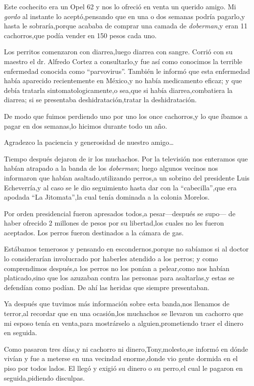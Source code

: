 \documentclass[letterpaper,12pt]{book}
\begin{document}
Este cochecito era un Opel 62 y nos lo ofreció en venta un querido amigo. Mi \textit{gordo} al instante lo aceptó,pensando que en una o dos semanas podría pagarlo,y hasta le sobraría,porque acababa de comprar una camada de \textit{doberman},y eran 11 cachorros,que podía vender en 150 pesos cada uno. 

Los perritos comenzaron con diarrea,luego diarrea con sangre. Corrió con su maestro el dr. Alfredo Cortez a consultarlo,y fue así como conocimos la terrible enfermedad conocida como ``parvovirus''. También le informó que esta enfermedad había aparecido recientemente en México,y no había medicamento eficaz; y que debía tratarla sintomatologicamente,o sea,que si había diarrea,combatiera la diarrea; si se presentaba deshidratación,tratar la deshidratación.

De modo que fuimos perdiendo uno por uno los once cachorros,y lo que íbamos a pagar en dos semanas,lo hicimos durante todo un año.

Agradezco la paciencia y generosidad de nuestro amigo\ldots

Tiempo después dejaron de ir los muchachos. Por la televisión nos enteramos que habían atrapado a la banda de los \textit{doberman}; luego algunos vecinos nos informaron que habían asaltado,utilizando perros,a un sobrino del presidente Luis Echeverría,y al caso se le dio seguimiento hasta dar con la ``cabecilla'',que era apodada ``La Jitomata'',la cual tenía dominada a la colonia Morelos. 

Por orden presidencial fueron apresados todos,a pesar---después se supo--- de haber ofrecido 2 millones de pesos por su libertad,los cuales no les fueron aceptados. Los perros fueron destinados a la cámara de gas.

Estábamos temerosos y pensando en escondernos,porque no sabíamos si al doctor lo considerarían involucrado por haberles atendido a los perros; y como comprendimos después,a los perros no los ponían a pelear,como nos habían platicado,sino que los azuzaban contra las personas para asaltarlas,y estas se defendían como podían. De ahí las heridas que siempre presentaban.

Ya después que tuvimos más información sobre esta banda,nos llenamos de terror,al recordar que en una ocasión,los muchachos se llevaron un cachorro que mi esposo tenía en venta,para mostrárselo a alguien,prometiendo traer el dinero en seguida.

Como pasaron tres días,y ni cachorro ni dinero,Tony,molesto,se informó en dónde vivían y fue a meterse en una vecindad enorme,donde vio gente dormida en el piso por todos lados.  El llegó y exigió su dinero o su perro,el cual le pagaron en seguida,pidiendo disculpas.
\end{document}
